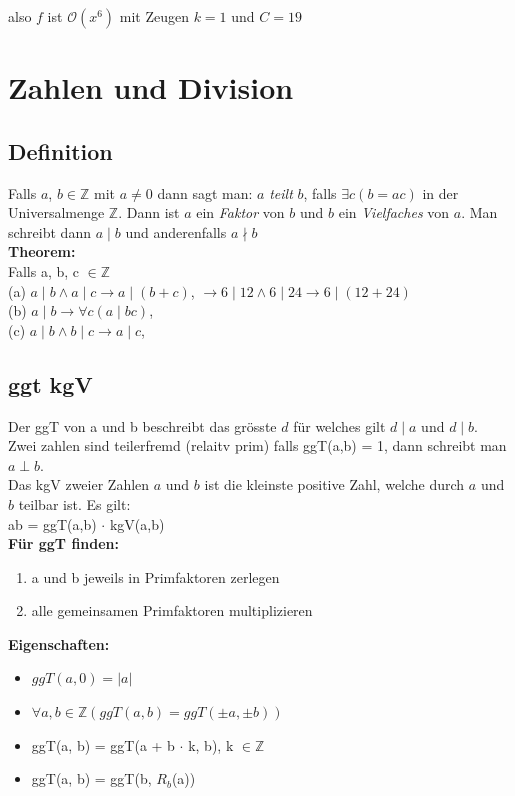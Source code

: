 \documentclass[12pt]{scrartcl}
\begin{document}
also $f$ ist $\mathcal{O}(x^6)$ mit Zeugen $k=1$ und $C = 19$


\newpage
\section{Zahlen und Division}
\subsection{Definition}
Falls $a$, $b \in \mathbb{Z}$ mit $a \neq 0$ dann sagt man: $a$ \textit{teilt} $b$, falls $\exists c (b = ac)$
in der Universalmenge $\mathbb{Z}$. Dann ist $a$ ein \textit{Faktor} von $b$ und $b$ ein \textit{Vielfaches}
von $a$. Man schreibt dann $a \mid b$ und anderenfalls $a \nmid b$\\

\textbf{Theorem:}\\
Falls a, b, c $\in \mathbb{Z}$\\
(a) $a \mid  b  \land a \mid c \rightarrow a \mid (b + c)$, $\rightarrow 6 \mid 12 \land 6 \mid 24 \rightarrow 6 \mid (12+24)$ \\  
(b) $a \mid b  \rightarrow \forall c(a \mid bc) $,\\  
(c) $a \mid b  \land b \mid c \rightarrow a \mid c$,\\  


\subsection{ggt kgV}
Der ggT von a und b beschreibt das grösste $d$ für welches gilt $d \mid a$ und $d \mid b$.\\
Zwei zahlen sind teilerfremd (relaitv prim) falls ggT(a,b) = 1, dann schreibt man
$a \perp b$. \\

Das kgV zweier Zahlen $a$ und $b$ ist die kleinste positive Zahl, welche durch
$a$ und $b$ teilbar ist. Es gilt:\\

ab = ggT(a,b) $\cdot$ kgV(a,b)\\


\textbf{Für ggT finden:}
\begin{enumerate}
    \item a und b jeweils in Primfaktoren zerlegen
    \item alle gemeinsamen Primfaktoren multiplizieren
\end{enumerate}

\textbf{Eigenschaften:}
\begin{itemize}
    \item $ggT(a,0) = |a|$
    \item $\forall a, b \in \mathbb{Z} (ggT(a,b) = ggT(\pm a, \pm b))$
    \item ggT(a, b) = ggT(a + b $\cdot$ k, b), k $\in \mathbb{Z}$
    \item ggT(a, b) = ggT(b, $R_b$(a))
\end{itemize}
\end{document}
